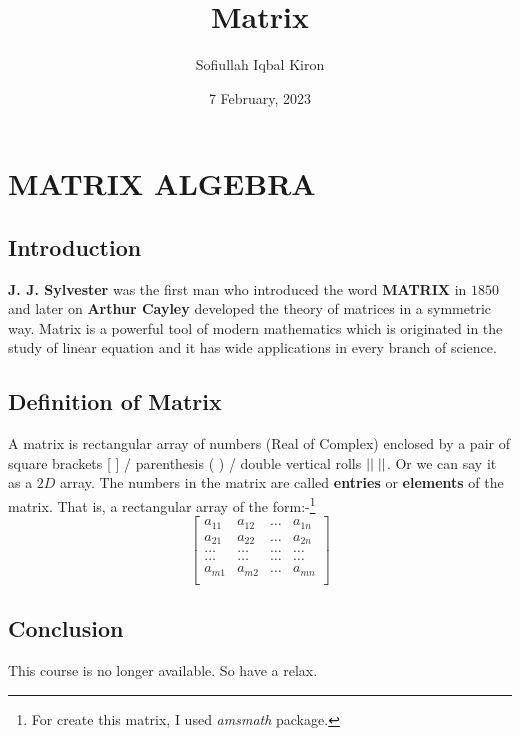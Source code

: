 \documentclass[6 pt]{book}
\title{Matrix}
\author{Sofiullah Iqbal Kiron}
\date{7 February, 2023}
\begin{document}
\maketitle

\section*{MATRIX ALGEBRA}
\subsection*{Introduction}
\textbf{J. J. Sylvester} was the first man who introduced the word \textbf{MATRIX} in $1850$ and later on \textbf{Arthur Cayley} developed the theory of matrices in a symmetric way. Matrix is a powerful tool of modern mathematics which is originated in the study of linear equation and it has wide applications in every branch of science.
\subsection*{Definition of Matrix}
A matrix is rectangular array of numbers (Real of Complex) enclosed by a pair of square brackets [ ] / parenthesis ( ) / double vertical rolls $||\hspace{1mm}||$. Or we can say it as a $2D$ array. The numbers in the matrix are called \textbf{entries} or \textbf{elements} of the matrix. That is, a rectangular array of the form:-\footnote{For create this matrix, I used \textit{amsmath} package.}
$$
	\begin{bmatrix} %
		a_{11} & a_{12} & \dots & a_{1n} \\
		a_{21} & a_{22} & \dots & a_{2n} \\
		\dots  & \dots  & \dots & \dots  \\
		\dots  & \dots  & \dots & \dots  \\
		a_{m1} & a_{m2} & \dots & a_{mn} \\
	\end{bmatrix}
$$
\subsection*{Conclusion}
This course is no longer available. So have a relax.
\end{document}
